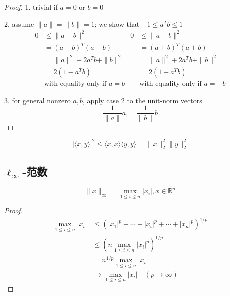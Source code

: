 \begin{proof}
    1. trivial if $ a=0 $ or $ b=0 $

2. assume $ \|a\|=\|b\|=1 $; we show that $ -1 \leq a^{T} b \leq 1 $
\begin{equation}
\begin{array}{rlrl}
0 & \leq\|a-b\|^{2} & 0 & \leq\|a+b\|^{2} \\
& =(a-b)^{T}(a-b) & & =(a+b)^{T}(a+b) \\
& =\|a\|^{2}-2 a^{T} b+\|b\|^{2} & & =\|a\|^{2}+2 a^{T} b+\|b\|^{2} \\
& =2\left(1-a^{T} b\right) & & =2\left(1+a^{T} b\right)\\
 & \text{with equality only if }a=b &  & \text{with equality only if }a=-b
\end{array}
\end{equation}

3. for general nonzero $ a, b $, apply case 2 to the unit-norm vectors
\begin{equation}
\frac{1}{\|a\|} a, \quad \frac{1}{\|b\|} b
\end{equation}
\end{proof}



\begin{corollary}
    \begin{equation} |\langle x, y\rangle|^{2} \leq\langle x, x\rangle\langle y, y\rangle=\|x\|_{2}^{2}\|y\|_{2}^{2} \end{equation}
\end{corollary}



\subsection{$ \ell_{\infty} $-范数}

\begin{definition}
    \begin{equation} \|x\|_{\infty}=\max _{1 \leq i \leq n}\left|x_{i}\right|, x \in \mathbb{R}^{n} \end{equation}
\end{definition}

\begin{proof}
    \begin{equation} \begin{aligned} \max _{1 \leq i \leq n}\left|x_{i}\right| 
        &\leq \left(\left|x_{1}\right|^{p}+\cdots+\left|x_{i}\right|^{p}+\cdots+\left|x_{n}\right|^{p}\right)^{1 / p} \\
        &\leq \left(n \max _{1 \leq i \leq n}\left|x_{i}\right|^{p}\right)^{1 / p}\\
        &  =n^{1 / p} \max _{1 \leq i \leq n}\left|x_{i}\right| \\ &\rightarrow \max _{1 \leq i \leq n}\left|x_{i}\right| \quad(p \rightarrow \infty)\end{aligned}
    \end{equation}
\end{proof}

